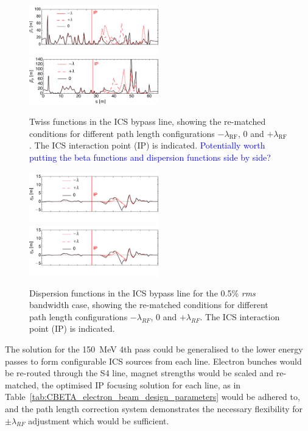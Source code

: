\documentclass[../main.tex]{subfiles}
\begin{document}
\begin{figure}[!h]
    \centering
    \includegraphics[width=0.5\textwidth]{Figures/CBETA_Inverse_Compton_Source_Design/twissplotx.pdf}
    \includegraphics[width=0.5\textwidth]{Figures/CBETA_Inverse_Compton_Source_Design/twissploty.pdf}
    \caption{Twiss functions in the ICS bypass line, showing the re-matched conditions for different path length configurations $-\lambda_{\mathrm{RF}}$, $0$ and $+\lambda_{\mathrm{RF}}$. The ICS interaction point (IP) is indicated. \textcolor{blue}{Potentially worth putting the beta functions and dispersion functions side by side?}}
    \label{fig:CBETA_ICS_Twiss}
\end{figure}

\begin{figure}[!h]
\centering
\includegraphics[width=0.5\textwidth]{Figures/CBETA_Inverse_Compton_Source_Design/dispplotx.pdf}
\includegraphics[width=0.5\textwidth]{Figures/CBETA_Inverse_Compton_Source_Design/dispplotx.pdf}
\caption{Dispersion functions in the ICS bypass line for the 0.5\% \textit{rms} bandwidth case, showing the re-matched conditions for different path length configurations $-\lambda_{RF}$, $0$ and $+\lambda_{RF}$. The ICS interaction point (IP) is indicated.}
\label{fig:CBETA_ICS_dispersion}
\end{figure}

The solution for the 150~\si{\mega\electronvolt} 4th pass could be generalised to the lower energy passes to form configurable ICS sources from each line. Electron bunches would be re-routed through the S4 line, magnet strengths would be scaled and re-matched, the optimised IP focusing solution for each line, as in Table~\ref{tab:CBETA_electron_beam_design_parameters} would be adhered to, and the path length correction system demonstrates the necessary flexibility for $\pm\lambda_{RF}$ adjustment which would be sufficient.
\end{document}
